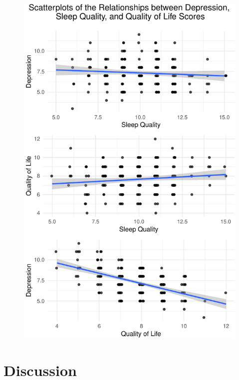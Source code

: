 \documentclass[man, noextraspace]{apa6}
\theoremstyle{definition}
\theoremstyle{definition}
\theoremstyle{definition}
\theoremstyle{remark}
\begin{document}
\begin{figure}
\centering
\includegraphics{APA_Document_files/figure-latex/plot 2-1.pdf}
\caption{}
\end{figure}

\section{Discussion}\label{discussion}
\end{document}

